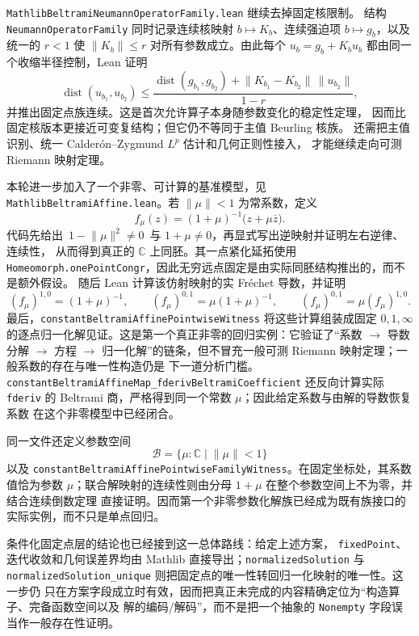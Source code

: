 \documentclass[UTF8,fontset=none,a4paper,11pt]{ctexart}
\begin{document}
\texttt{MathlibBeltramiNeumannOperator}\allowbreak\texttt{Family.lean}\linebreak
继续去掉固定核限制。
结构 \texttt{NeumannOperatorFamily} 同时记录连续核映射
\(b\mapsto K_b\)、连续强迫项 \(b\mapsto g_b\)，以及统一的
\(r<1\) 使 \(\lVert K_b\rVert\leq r\) 对所有参数成立。由此每个
\(u_b=g_b+K_bu_b\) 都由同一个收缩半径控制，Lean 证明
\[
 \operatorname{dist}(u_{b_1},u_{b_2})
 \leq
 \frac{\operatorname{dist}(g_{b_1},g_{b_2})
       +\lVert K_{b_1}-K_{b_2}\rVert\,\lVert u_{b_2}\rVert}
      {1-r},
\]
并推出固定点族连续。这是首次允许算子本身随参数变化的稳定性定理，
因而比固定核版本更接近可变复结构；但它仍不等同于主值 Beurling 核族。
还需把主值识别、统一 Calderón--Zygmund \(L^p\) 估计和几何正则性接入，
才能继续走向可测 Riemann 映射定理。\par

本轮进一步加入了一个非零、可计算的基准模型，见
\texttt{MathlibBeltramiAffine}\allowbreak\texttt{.lean}。若 $\lVert\mu\rVert<1$ 为常系数，定义
\[
 f_\mu(z)=(1+\mu)^{-1}\bigl(z+\mu\overline z\bigr).
\]
代码先给出
\(\,1-\lVert\mu\rVert^2\ne0\,\) 与 \(1+\mu\ne0\)，再显式写出逆映射并证明左右逆律、连续性，
从而得到真正的 \(\mathbb C\) 上同胚。其一点紧化延拓使用
\texttt{Homeomorph.onePointCongr}，因此无穷远点固定是由实际同胚结构推出的，而不是额外假设。
随后 Lean 计算该仿射映射的实 Fréchet 导数，并证明
\[
 (f_\mu)^{1,0}=(1+\mu)^{-1},\qquad
 (f_\mu)^{0,1}=\mu(1+\mu)^{-1},\qquad
 (f_\mu)^{0,1}=\mu(f_\mu)^{1,0}.
\]
最后，\texttt{constantBeltramiAffinePointwiseWitness} 将这些计算组装成固定 $0,1,\infty$
的逐点归一化解见证。这是第一个真正非零的回归实例：它验证了“系数 $\to$ 导数分解 $\to$
方程 $\to$ 归一化解”的链条，但不冒充一般可测 Riemann 映射定理；一般系数的存在与唯一性构造仍是
下一道分析门槛。
\texttt{constantBeltramiAffineMap\_fderivBeltramiCoefficient} 还反向计算实际
\texttt{fderiv} 的 Beltrami 商，严格得到同一个常数 $\mu$；因此给定系数与由解的导数恢复系数
在这个非零模型中已经闭合。

同一文件还定义参数空间
\[
 \mathcal B=\{\mu:\mathbb C\mid \lVert\mu\rVert<1\}
\]
以及 \texttt{constantBeltramiAffinePointwiseFamilyWitness}。在固定坐标处，其系数值恰为参数
\(\mu\)；联合解映射的连续性则由分母 \(1+\mu\) 在整个参数空间上不为零，并结合连续倒数定理
直接证明。因而第一个非零参数化解族已经成为既有族接口的实际实例，而不只是单点回归。

条件化固定点层的结论也已经接到这一总体路线：给定上述方案，
\texttt{fixedPoint}、迭代收敛和几何误差界均由
Mathlib 直接导出；\texttt{normalizedSolution} 与
\texttt{normalizedSolution\_unique} 则把固定点的唯一性转回归一化映射的唯一性。这一步仍
只在方案字段成立时有效，因而把真正未完成的内容精确定位为“构造算子、完备函数空间以及
解的编码/解码”，而不是把一个抽象的 \texttt{Nonempty} 字段误当作一般存在性证明。
\end{document}
